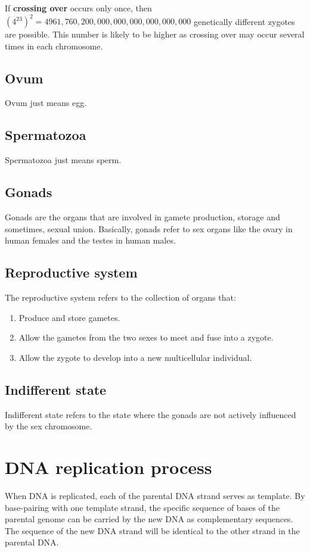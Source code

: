 \documentclass[11pt]{article}
\begin{document}
If \textbf{crossing over} occurs only once, then \((4^{23})^2 = 4961,760,200,000,000,000,000,000,000\) genetically different zygotes are possible. This number is likely to be higher as crossing over may occur several times in each chromosome.
\subsection{Ovum}
\label{sec:orgdaa63e1}
Ovum just means egg.
\subsection{Spermatozoa}
\label{sec:org6bf6095}
Spermatozoa just means sperm.
\subsection{Gonads}
\label{sec:org9aa396a}
Gonads are the organs that are involved in gamete production, storage and sometimes, sexual union. Basically, gonads refer to sex organs like the ovary in human females and the testes in human males.
\subsection{Reproductive system}
\label{sec:orge8e418d}
The reproductive system refers to the collection of organs that:
\begin{enumerate}
\item Produce and store gametes.
\item Allow the gametes from the two sexes to meet and fuse into a zygote.
\item Allow the zygote to develop into a new multicellular individual.
\end{enumerate}
\subsection{Indifferent state}
\label{sec:orga21a364}
Indifferent state refers to the state where the gonads are not actively influenced by the sex chromosome.

\newpage
\section{DNA replication process}
\label{sec:org728e0ae}
When DNA is replicated, each of the parental DNA strand serves as template. By base-pairing with one template strand, the specific sequence of bases of the parental genome can be carried by the new DNA as complementary sequences. The sequence of the new DNA strand will be identical to the other strand in the parental DNA.
\end{document}
